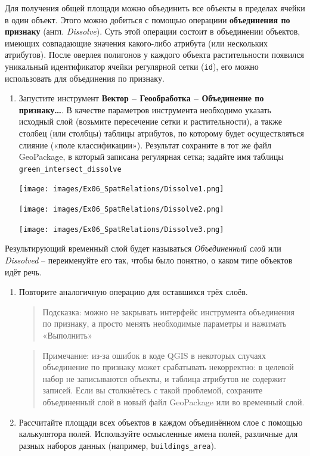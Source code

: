 \documentclass[
  12pt,
]{book}
\begin{document}
Для получения общей площади можно объединить все объекты в пределах ячейки в один объект. Этого можно добиться с помощью операциии \textbf{объединения по признаку} (англ. \emph{Dissolve}). Суть этой операции состоит в объединении объектов, имеющих совпадающие значения какого-либо атрибута (или нескольких атрибутов). После оверлея полигонов у каждого объекта растительности появился уникальный идентификатор ячейки регулярной сетки (\texttt{id}), его можно использовать для объединения по признаку.

\begin{enumerate}
\def\labelenumi{\arabic{enumi}.}
\setcounter{enumi}{4}
\item
  Запустите инструмент \textbf{Вектор -- Геообработка -- Объединение по признаку\ldots{}}. В качестве параметров инструмента необходимо указать исходный слой (возьмите пересечение сетки и растительности), а также столбец (или столбцы) таблицы атрибутов, по которому будет осуществляться слияние («поле классификации»). Результат сохраните в тот же файл GeoPackage, в который записана регулярная сетка; задайте имя таблицы \texttt{green\_intersect\_dissolve}

  \texttt{[image: images/Ex06\_SpatRelations/Dissolve1.png]}

  \texttt{[image: images/Ex06\_SpatRelations/Dissolve2.png]}

  \texttt{[image: images/Ex06\_SpatRelations/Dissolve3.png]}
\end{enumerate}

Результирующий временный слой будет называться \emph{Объединенный слой} или \emph{Dissolved} -- переименуйте его так, чтобы было понятно, о каком типе объектов идёт речь.

\begin{enumerate}
\def\labelenumi{\arabic{enumi}.}
\setcounter{enumi}{4}
\item
  Повторите аналогичную операцию для оставшихся трёх слоёв.

  \begin{quote}
  Подсказка: можно не закрывать интерфейс инструмента объединения по признаку, а просто менять необходимые параметры и нажимать «Выполнить»
  \end{quote}

  \begin{quote}
  Примечание: из-за ошибок в коде QGIS в некоторых случаях объединение по признаку может срабатывать некорректно: в целевой набор не записываются объекты, и таблица атрибутов не содержит записей. Если вы столкнётесь с такой проблемой, сохраните объединенный слой в новый файл GeoPackage или во временный слой.
  \end{quote}
\item
  Рассчитайте площади всех объектов в каждом объединённом слое с помощью калькулятора полей. Используйте осмысленные имена полей, различные для разных наборов данных (например, \texttt{buildings\_area}).
\end{enumerate}
\end{document}

